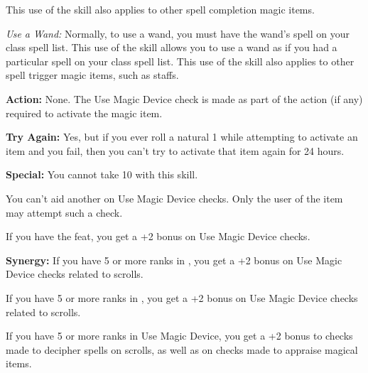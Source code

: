 This use of the skill also applies to other spell completion magic items.

\textit{Use a Wand:} Normally, to use a wand, you must have the wand's spell on your class spell list. This use of the skill allows you to use a wand as if you had a particular spell on your class spell list. This use of the skill also applies to other spell trigger magic items, such as staffs.

\textbf{Action:} None. The Use Magic Device check is made as part of the action (if any) required to activate the magic item.

\textbf{Try Again:} Yes, but if you ever roll a natural 1 while attempting to activate an item and you fail, then you can't try to activate that item again for 24 hours.

\textbf{Special:} You cannot take 10 with this skill.

You can't aid another on Use Magic Device checks. Only the user of the item may attempt such a check.

If you have the  feat, you get a +2 bonus on Use Magic Device checks.

\textbf{Synergy:} If you have 5 or more ranks in , you get a +2 bonus on Use Magic Device checks related to scrolls.

If you have 5 or more ranks in , you get a +2 bonus on Use Magic Device checks related to scrolls.

If you have 5 or more ranks in Use Magic Device, you get a +2 bonus to  checks made to decipher spells on scrolls, as well as on  checks made to appraise magical items.

